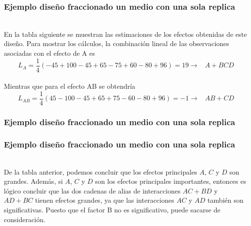 \documentclass[12pt]{beamer}
\begin{document}
\begin{frame}
\frametitle{Ejemplo diseño fraccionado un medio con una sola replica}
~\\En la tabla siguiente se muestran las estimaciones de los efectos obtenidas de este diseño. Para mostrar los cálculos, la combinación lineal de las observaciones asociadas con el efecto de A es
$$L_A=\frac{1}{4}(-45+100-45+65-75+60-80+96)=19 \rightarrow \;\;\; A+BCD $$
~\\Mientras que para el efecto AB se obtendría
$$L_{AB}=\frac{1}{4}(45-100-45+65+75-60-80+96)=-1 \rightarrow \;\;\; AB+CD $$

\end{frame}

\begin{frame}
\frametitle{Ejemplo diseño fraccionado un medio con una sola replica}
\begin{table}[H]
  \centering
  \caption{Estimaciones de los efectos y los alias}
  \label{tab:addlabel}%
\end{table}%
\end{frame}

\begin{frame}
\frametitle{Ejemplo diseño fraccionado un medio con una sola replica}
~\\De la tabla anterior, podemos concluir que los efectos principales $A$, $C$ y $D$ son grandes. Además, si $A$, $C$ y $D$ son los efectos principales importantes, entonces es lógico concluir que las dos cadenas de alias de interacciones $AC+BD$ y $AD+BC$ tienen efectos grandes, ya que las interacciones $AC$ y $AD$ también son significativas. Puesto que el factor B no es significativo, puede sacarse de consideración.
\end{frame}
\end{document}
